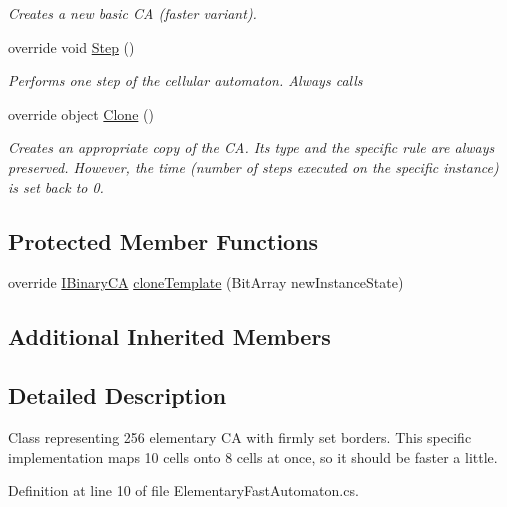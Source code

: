 \begin{DoxyCompactItemize}
\begin{DoxyCompactList}\small\item\em Creates a new basic C\+A (faster variant). \end{DoxyCompactList}\item 
override void \hyperlink{class_cellular_1_1_elementary_fast_automaton_aa877bef8b8242c58e190a884d18f3b5f}{Step} ()
\begin{DoxyCompactList}\small\item\em Performs one step of the cellular automaton. Always calls \end{DoxyCompactList}\item 
override object \hyperlink{class_cellular_1_1_elementary_fast_automaton_a98bbdcade0ac93dd0fbc96ba253c2978}{Clone} ()
\begin{DoxyCompactList}\small\item\em Creates an appropriate copy of the C\+A. Its type and the specific rule are always preserved. However, the time (number of steps executed on the specific instance) is set back to 0. \end{DoxyCompactList}\end{DoxyCompactItemize}
\subsection*{Protected Member Functions}
\begin{DoxyCompactItemize}
\item 
override \hyperlink{interface_cellular_1_1_i_binary_c_a}{I\+Binary\+C\+A} \hyperlink{class_cellular_1_1_elementary_fast_automaton_a95b5abc22d134cb9640b56a0a70c1454}{clone\+Template} (Bit\+Array new\+Instance\+State)
\end{DoxyCompactItemize}
\subsection*{Additional Inherited Members}


\subsection{Detailed Description}
Class representing 256 elementary C\+A with firmly set borders. This specific implementation maps 10 cells onto 8 cells at once, so it should be faster a little. 



Definition at line 10 of file Elementary\+Fast\+Automaton.\+cs.



